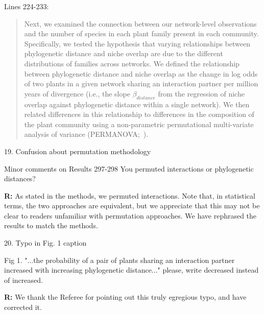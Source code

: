 \documentclass[12pt]{letter}
\newenvironment{refquote}{\bigskip \begin{it}}{\end{it}\smallskip}
\providecommand{\DIFaddbegin}{} %
\providecommand{\DIFaddend}{} %
\newcommand{\DIFaddincludegraphics}[2][]{{\color{blue}\fbox{\DIFOincludegraphics[#1]{#2}}}} %
\DeclareRobustCommand{\DIFaddbegin}{\DIFOaddbegin \let\includegraphics\DIFaddincludegraphics} %
\DeclareRobustCommand{\DIFaddend}{\DIFOaddend \let\includegraphics\DIFOincludegraphics} %
\begin{document}
		Lines 224-233:

		\begin{quotation}
			Next, we examined the connection between our network-level observations
			and the number of species in each plant family present in each community.
			Specifically, we tested the hypothesis that
			varying relationships between phylogenetic distance and
			niche overlap are due to the different distributions 
			of families across networks. We defined the relationship between
			phylogenetic distance and niche overlap as the change in 
			log odds of two plants in a given network sharing an interaction 
			partner per million years of divergence (i.e., the slope $\beta_{distance}$ from the 
			regression of niche overlap against phylogenetic distance within
			a single network). We then related differences in this relationship
			to differences in the composition of the plant community 
			using a non-parametric permutational multi-variate 
			analysis of variance (PERMANOVA;~\citealp{Anderson2001}).
	    \end{quotation}


\DIFaddbegin 


	\DIFaddend 19. Confusion about permutation methodology 

		\begin{refquote}
			Minor comments on Results
			297-298 You permuted interactions or phylogenetic distances?
		\end{refquote}


		\textbf{R:} As stated in the methods, we permuted interactions. Note that, in statistical terms, the two approaches are equivalent, but we appreciate that this may not be clear to readers unfamiliar with permutation approaches. We have rephrased the results to match the methods.


	20. Typo in Fig. 1 caption 

		\begin{refquote}
			Fig 1. "...the probability of a pair of plants sharing an interaction partner increased with increasing phylogenetic distance..." please, write decreased instead of increased.
		\end{refquote}


		\textbf{R:} We thank the Referee for pointing out this truly egregious typo, and have corrected it.
\end{document}

